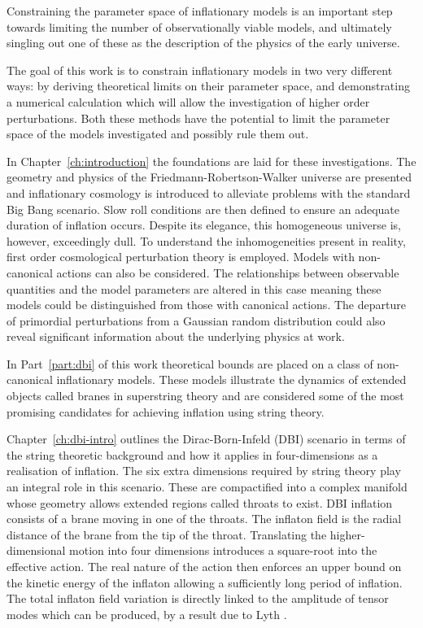 Constraining the parameter space of inflationary models is an important step
towards limiting the number of observationally viable models, and ultimately
singling out one of these as the description of the physics of the early
universe. 

The goal of this work is to constrain inflationary models in two very different
ways: by deriving theoretical limits on their parameter space, and demonstrating
a numerical calculation which will allow the investigation of higher order
perturbations. Both these methods have the potential to limit the
parameter space of the models investigated and possibly rule them out.


In Chapter~\ref{ch:introduction} the foundations are laid for these investigations.
The geometry and physics of the Friedmann-Robertson-Walker universe are presented and
inflationary cosmology is introduced to alleviate problems with the standard Big
Bang scenario. Slow roll conditions are then defined to ensure an adequate duration
of inflation occurs. Despite its elegance, this homogeneous universe is, however,
exceedingly dull. To understand the inhomogeneities present in reality, first order
cosmological perturbation theory is employed. Models with non-canonical
actions can also be considered. The relationships between observable quantities and
the model parameters are altered in this case meaning these models could be
distinguished from those with canonical actions. The departure of primordial
perturbations from a Gaussian random distribution could also reveal significant
information about the underlying physics at work.


In Part~\ref{part:dbi} of this work theoretical bounds are placed on a class of
non-canonical inflationary models. These models illustrate the dynamics of
extended objects called branes in superstring theory and are considered some of
the most promising candidates for achieving inflation using string theory.

Chapter~\ref{ch:dbi-intro} outlines the Dirac-Born-Infeld (DBI) scenario in
terms of the string theoretic background and how it applies in four-dimensions
as a realisation of inflation. The six extra dimensions required by string theory
play an integral role in this scenario. These are compactified into a complex
manifold whose geometry allows extended regions called throats to exist. DBI
inflation consists of a brane moving in one of the throats. The inflaton field is
the radial distance of the brane from the tip of the throat. Translating the
higher-dimensional motion into four dimensions introduces a square-root into the
effective action. The real nature of the action then enforces an upper bound on the
kinetic energy of the inflaton allowing a sufficiently long period of inflation. The
total inflaton field variation is directly linked to the
amplitude of tensor modes which can be produced, by a result due to Lyth
\cite{lyth}.


